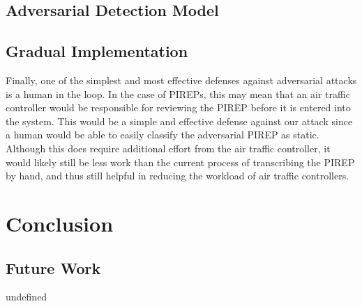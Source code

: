 
\subsection{Adversarial Detection Model}


\subsection{Gradual Implementation}

Finally, one of the simplest and most effective defenses against adversarial
attacks is a human in the loop. In the case of PIREPs, this may mean that an air
traffic controller would be responsible for reviewing the PIREP before it is
entered into the system. This would be a simple and effective defense against
our attack since a human would be able to easily classify the adversarial PIREP
as static. Although this does require additional effort from the air traffic
controller, it would likely still be less work than the current process of
transcribing the PIREP by hand, and thus still helpful in reducing the workload
of air traffic controllers.

\section{Conclusion}

\subsection{Future Work}





undefined